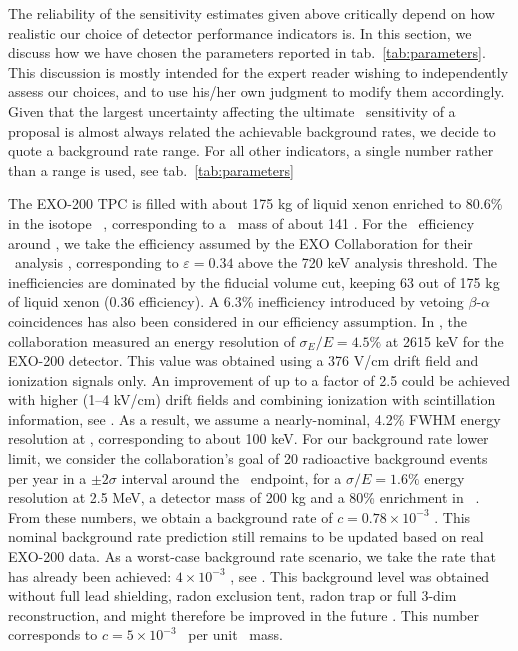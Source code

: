 The reliability of the sensitivity estimates given above critically depend on how realistic our choice of detector performance indicators is. In this section, we discuss how we have chosen the parameters reported in tab.~\ref{tab:parameters}. This discussion is mostly intended for the expert reader wishing to independently assess our choices, and to use his/her own judgment to modify them accordingly. Given that the largest uncertainty affecting the ultimate \mbb\ sensitivity of a proposal is almost always related the achievable background rates, we decide to quote a background rate range. For all other indicators, a single number rather than a range is used, see tab.~\ref{tab:parameters} 

The EXO-200 TPC is filled with about 175 kg of liquid xenon enriched to 80.6\% in the isotope \XE\ \cite{EXO-200:2011xzf}, corresponding to a \bb\ mass of about 141 \kgbb. For the \bbonu\ efficiency around \Qbb, we take the efficiency assumed by the EXO Collaboration for their \bbtnu\ analysis \cite{EXO-200:2011xzf}, corresponding to $\varepsilon = 0.34$ above the 720 keV analysis threshold. The inefficiencies are dominated by the fiducial volume cut, keeping 63 out of 175 kg of liquid xenon \cite{EXO-200:2011xzf} (0.36 efficiency). A 6.3\% inefficiency introduced by vetoing $\beta$-$\alpha$ coincidences \cite{EXO-200:2011xzf} has also been considered in our efficiency assumption. In \cite{EXO-200:2011xzf}, the collaboration measured an energy resolution of $\sigma_E/E=4.5\%$ at 2615 keV for the EXO-200 detector. This value was obtained using a 376 V/cm drift field and ionization signals only. An improvement of up to a factor of 2.5 could be achieved with higher (1--4 kV/cm) drift fields and combining ionization with scintillation information, see \cite{EXO-200:2003bso}. As a result, we assume a nearly-nominal, 4.2\% FWHM energy resolution at \Qbb, corresponding to about 100 keV. For our background rate lower limit, we consider the collaboration's goal of 20 radioactive background events per year in a $\pm 2\sigma$ interval around the \Qbb\ endpoint, for a $\sigma/E=1.6\%$ energy resolution at 2.5 MeV, a detector mass of 200 kg and a 80\% enrichment in \XE\ \cite{Hall:2010zzg}. From these numbers, we obtain a background rate of $c=0.78\times 10^{-3}$ \ckkbby. This nominal background rate prediction still remains to be updated based on real EXO-200 data. As a worst-case background rate scenario, we take the rate that has already been achieved: $4\times 10^{-3}$ \ckky, see \cite{EXO-200:2011xzf}. This background level was obtained without full lead shielding, radon exclusion tent, radon trap or full 3-dim reconstruction, and might therefore be improved in the future \cite{EXO-200:2011xzf}. This number corresponds to $c=5\times 10^{-3}$ \ckkbby\ per unit \bb\ mass.

